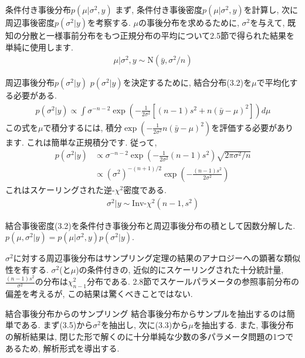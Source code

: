 \documentclass[10pt,dvipdfmx,a4]{beamer}
\newcommand{\eq}[1]{\begin{align}#1\end{align}}
\newcommand{\eqn}[1]{\begin{align*}#1\end{align*}}
\begin{document}

\begin{frame}{条件付き事後分布$p(\mu|\sigma^2,y)$}
まず, 条件付き事後密度$p(\mu|\sigma^2,y)$を計算し, 次に周辺事後密度$p(\sigma^2|y)$を考察する.
$\mu$の事後分布を求めるために, $\sigma^2$を与えて, 既知の分散と一様事前分布をもつ正規分布の平均について2.5節で得られた結果を単純に使用します.
\eq{\mu|\sigma^2, y\sim\text{N}(\bar{y},\sigma^2/n)}
\end{frame}


\begin{frame}{周辺事後分布$p(\sigma^2|y)$}
$p(\sigma^2|y)$を決定するために, 結合分布(3.2)を$\mu$で平均化する必要がある.
\eqn{p(\sigma^2|y)\propto \int\sigma^{-n-2}\exp \left(-\frac{1}{2\sigma^2}[(n-1)s^2+n(\bar{y}-\mu)^2]\right)d\mu}
この式を$\mu$で積分するには, 積分$\exp(-\tfrac{1}{2\sigma^2}n(\bar{y}-\mu)^2)$を評価する必要があります.
これは簡単な正規積分です.
従って, 
\eq{p(\sigma^2|y)&\propto \sigma^{-n-2}\exp \left(-\frac{1}{2\sigma^2}(n-1)s^2\right)\sqrt{2\pi\sigma^2/n}\nonumber\\
&\propto(\sigma^2)^{-(n+1)/2}\exp\left(-\frac{(n-1)s^2}{2\sigma^2}\right)}
これはスケーリングされた逆-$\chi^2$密度である.
\eq{\sigma^2|y\sim \text{Inv-}\chi^2(n-1,s^2)}
\end{frame}


\begin{frame}
結合事後密度(3.2)を条件付き事後分布と周辺事後分布の積として因数分解した.
$p(\mu,\sigma^2|y)=p(\mu|\sigma^2, y)p(\sigma^2|y)$.

$\sigma^2$に対する周辺事後分布はサンプリング定理の結果のアナロジーへの顕著な類似性を有する.
$\sigma^2$(と$\mu$)の条件付きの, 近似的にスケーリングされた十分統計量, $\tfrac{(n-1)s^2}{\sigma^2}$の分布は$\chi^2_{n-1}$分布である.
2.8節でスケールパラメータの参照事前分布の偏差を考えるが, この結果は驚くべきことではない.
\end{frame}


\begin{frame}{結合事後分布からのサンプリング}
結合事後分布からサンプルを抽出するのは簡単である.
まず(3.5)から$\sigma^2$を抽出し, 次に(3.3)から$\mu$を抽出する.
また, 事後分布の解析結果は, 閉じた形で解くのに十分単純な少数の多パラメータ問題の1つであるため, 解析形式を導出する.
\end{frame}
\end{document}
